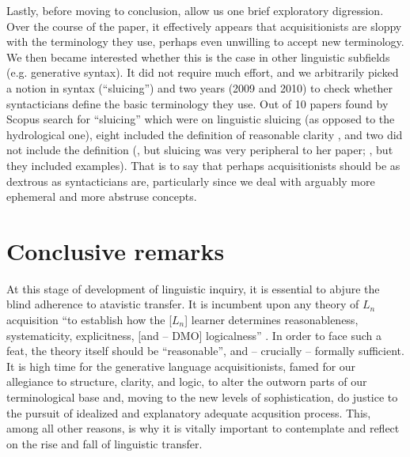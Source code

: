 \documentclass{article}
\begin{document}
Lastly, before moving to conclusion, allow us one brief exploratory digression. Over the course of the paper, it effectively appears that acquisitionists are sloppy with the terminology they use, perhaps even unwilling to accept new terminology. We then became interested whether this is the case in other linguistic subfields (e.g. generative syntax). It did not require much effort, and we arbitrarily picked a notion in syntax (“sluicing”) and two years (2009 and 2010) to check whether syntacticians define the basic terminology they use. Out of 10 papers found by Scopus search for “sluicing” which were on linguistic sluicing (as opposed to the hydrological one), eight included the definition of reasonable clarity \citep{park_resolving_2009, van_craenenbroeck_syntax_2009, khan_resolving_2010, kimura_wh--situ_2010, saab_silent_2010, van_craenenbroeck_invisible_2010, yoshida_antecedent-contained_2010, poirier_real-time_2010}, and two did not include the definition (\citet{hall_subsentential_2009}, but sluicing was very peripheral to her paper; \citet{arregi_ellipsis_2010}, but they included examples). That is to say that perhaps acquisitionists should be as dextrous as syntacticians are, particularly since we deal with arguably more ephemeral and more abstruse concepts.

\section{Conclusive remarks}

At this stage of development of linguistic inquiry, it is essential to abjure the blind adherence to atavistic transfer. It is incumbent upon any theory of $L_n$ acquisition ``to establish how the [$L_n$] learner determines reasonableness, systematicity, explicitness, [and -- DMO] logicalness'' \citep[][p. 28]{flynn_parameter-setting_1987}. In order to face such a feat, the theory itself should be ``reasonable'', and -- crucially -- formally sufficient. It is high time for the generative language acquisitionists, famed for our allegiance to structure, clarity, and logic, to alter the outworn parts of our terminological base and, moving to the new levels of sophistication, do justice to the pursuit of idealized and explanatory adequate acqusition process. This, among all other reasons, is why it is vitally important to contemplate and reflect on the rise and fall of linguistic transfer.



\end{document}
